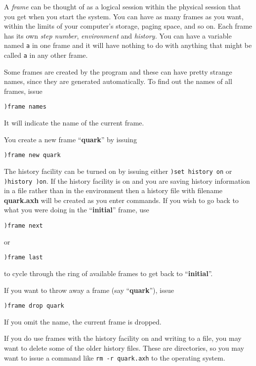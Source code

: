\par{}

A {\it frame} can be thought of as a logical session within the
physical session that you get when you start the system.  You can
have as many frames as you want, within the limits of your computer's
storage, paging space, and so on.
Each frame has its own {\it step number}, {\it environment} and {\it history.}
You can have a variable named {\tt a} in one frame and it will
have nothing to do with anything that might be called {\tt a} in
any other frame.

Some frames are created by the \HyperName{} program and these can
have pretty strange names, since they are generated automatically.
To find out the names
of all frames, issue
\begin{verbatim}
)frame names
\end{verbatim}
It will indicate the name of the current frame.

You create a new frame
``{\bf quark}'' by issuing
\begin{verbatim}
)frame new quark
\end{verbatim}
The history facility can be turned on by issuing either
{\tt )set history on} or {\tt )history )on}.
If the history facility is on and you are saving history information
in a file rather than in the \Language{} environment
then a history file with filename {\bf quark.axh} will
be created as you enter commands.
If you wish to go back to what
you were doing in the
``{\bf initial}'' frame, use
\begin{verbatim}
)frame next
\end{verbatim}
or
\begin{verbatim}
)frame last
\end{verbatim}
to cycle through the ring of available frames to get back to
``{\bf initial}''.

If you want to throw
away a frame (say ``{\bf quark}''), issue
\begin{verbatim}
)frame drop quark
\end{verbatim}
If you omit the name, the current frame is dropped.

If you do use frames with the history facility on and writing to a file,
you may want to delete some of the older history files.
These are directories, so you may want to issue a command like
{\tt rm -r quark.axh} to the operating system.

